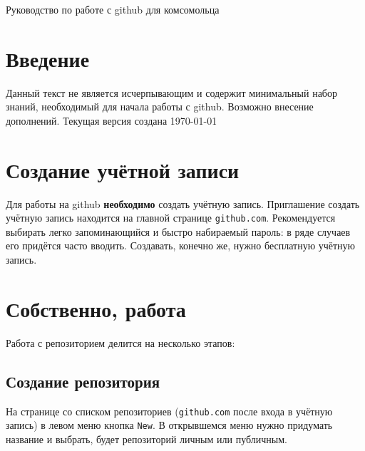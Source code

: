 \documentclass[oneside, final, 12pt]{article}
\begin{document}
\begin{center}
\Large{Руководство по работе с github для комсомольца}\\
\end{center}

\tableofcontents

\section*{Введение}
Данный текст не является исчерпывающим и содержит минимальный набор знаний, необходимый для начала работы с github. Возможно внесение дополнений.
Текущая версия создана \today
\section{Создание учётной записи}
Для работы на github {\bf необходимо} создать учётную запись. Приглашение создать учётную запись находится на главной странице \texttt{github.com}. Рекомендуется выбирать легко запоминающийся и быстро набираемый пароль: в ряде случаев его придётся часто вводить. Создавать, конечно же, нужно бесплатную учётную запись.
\section{Собственно, работа}
Работа с репозиторием делится на несколько этапов:
\subsection{Создание репозитория}
На странице со списком репозиториев (\texttt{github.com} после входа в учётную запись) в левом меню кнопка \texttt{New}. В открывшемся меню нужно придумать название и выбрать, будет репозиторий личным или публичным.
\end{document}
